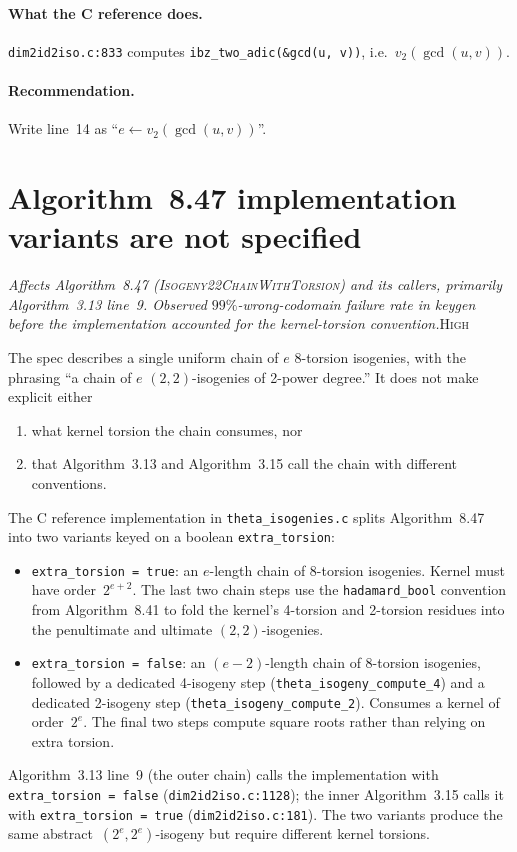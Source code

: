 \documentclass[a4paper,11pt]{article}
\newcommand{\algo}[1]{Algorithm~#1}
\newcommand{\high}{\textsc{\color{BurntOrange}High}}
\newcommand{\finding}[2]{\noindent\textit{#1}\hfill#2\par\smallskip}
\begin{document}
\paragraph{What the C reference does.}
\texttt{dim2id2iso.c:833} computes
\texttt{ibz\_two\_adic(\&gcd(u, v))}, i.e.\ $v_2(\gcd(u, v))$.

\paragraph{Recommendation.}
Write line~14 as ``$e \leftarrow v_2(\gcd(u, v))$''.

\section{\algo{8.47} implementation variants are not specified}
\label{sec:iso22chain-variants}

\finding{Affects \algo{8.47} (\textsc{Isogeny22ChainWithTorsion})
  and its callers, primarily \algo{3.13} line~9.  Observed
  $99\%$-wrong-codomain failure rate in keygen before the
  implementation accounted for the kernel-torsion convention.}{\high}

The spec describes a single uniform chain of $e$ 8-torsion
isogenies, with the phrasing ``a chain of $e$ $(2,2)$-isogenies of
2-power degree.''  It does not make explicit either
\begin{enumerate}
  \item what kernel torsion the chain consumes, nor
  \item that \algo{3.13} and \algo{3.15} call the chain with
    different conventions.
\end{enumerate}
The C reference implementation in
\texttt{theta\_isogenies.c} splits \algo{8.47} into two variants
keyed on a boolean \texttt{extra\_torsion}:
\begin{itemize}
  \item \texttt{extra\_torsion = true}: an $e$-length chain of
    8-torsion isogenies.  Kernel must have order~$2^{e+2}$.  The
    last two chain steps use the \texttt{hadamard\_bool}
    convention from \algo{8.41} to fold the kernel's 4-torsion
    and 2-torsion residues into the penultimate and ultimate
    $(2,2)$-isogenies.
  \item \texttt{extra\_torsion = false}: an $(e-2)$-length chain
    of 8-torsion isogenies, followed by a dedicated 4-isogeny
    step (\texttt{theta\_isogeny\_compute\_4}) and a dedicated
    2-isogeny step (\texttt{theta\_isogeny\_compute\_2}).
    Consumes a kernel of order~$2^e$.  The final two steps
    compute square roots rather than relying on extra torsion.
\end{itemize}
\algo{3.13} line~9 (the outer chain) calls the implementation
with \texttt{extra\_torsion = false}
(\texttt{dim2id2iso.c:1128}); the inner \algo{3.15} calls it with
\texttt{extra\_torsion = true} (\texttt{dim2id2iso.c:181}).  The
two variants produce the same abstract~$(2^e, 2^e)$-isogeny but
require different kernel torsions.
\end{document}
